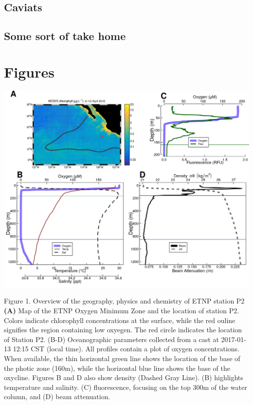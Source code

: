 \documentclass[]{article}
\begin{document}
\hypertarget{caviats}{%
\subsection{Caviats}\label{caviats}}

\hypertarget{some-sort-of-take-home}{%
\subsection{Some sort of take home}\label{some-sort-of-take-home}}

\hypertarget{section}{%
\subsection{}\label{section}}

\hypertarget{figures}{%
\section{Figures}\label{figures}}

\includegraphics{../figures/CombinedP2Info.png}

Figure 1. Overview of the geography, physics and chemistry of ETNP
station P2 \textbf{(A)} Map of the ETNP Oxygen Minimum Zone and the
location of station P2. Colors indicate chlorophyll concentrations at
the surface, while the red ouline signifies the region containing low
oxyegen. The red circle indicates the location of Station P2. (B-D)
Oceanographic parameters collected from a cast at 2017-01-13 12:15 CST
(local time). All profiles contain a plot of oxygen concentrations. When
available, the thin horizontal green line shows the location of the base
of the photic zone (160m), while the horizontal blue line shows the base
of the oxycline. Figures B and D also show density (Dashed Gray Line).
(B) highlights temperature and salinity. (C) fluorescence, focusing on
the top 300m of the water column, and (D) beam attenuation.
\end{document}
